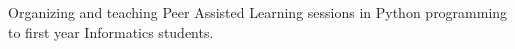 \documentclass[10pt,a4paper,ragged2e]{altacv}
\begin{document}
    \divider



    \small Organizing and teaching Peer Assisted Learning sessions in Python programming to first year Informatics students.










    \clearpage


    \nocite{*}






\end{document}
